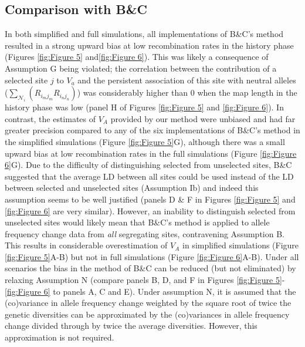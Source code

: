 \documentclass[12pt]{article}
\begin{document}
\begin{bibunit}
\subsection*{Comparison with B\&C}

In both simplified and full simulations, all implementations of B\&C's method resulted in a strong upward bias at low recombination rates in the history phase (Figures \ref{fig:Figure 5} and\ref{fig:Figure 6}). This was likely a consequence of Assumption G being violated; the correlation between the contribution of a selected site $j$ to $V_a$ and the persistent association of this site with neutral alleles ($\sum_{ \mathcal{N}_i}(R_{{i_m}{j_m}}R_{{i_n}{j_n}})$) was considerably higher than 0 when the map length in the history phase was low (panel H of Figures \ref{fig:Figure 5} and \ref{fig:Figure 6}). In contrast, the estimates of $V_A$ provided by our method were unbiased and had far greater precision compared to any of the six implementations of B\&C's method in the simplified simulations (Figure \ref{fig:Figure 5}G), although there was a small upward bias at low recombination rates in the full simulations (Figure \ref{fig:Figure 6}G). Due to the difficulty of distinguishing selected from unselected sites, B\&C suggested that the average LD between all sites could be used instead of the LD between selected and unselected sites (Assumption Ib) and indeed this assumption seems to be well justified (panels D \& F in Figures \ref{fig:Figure 5} and \ref{fig:Figure 6} are very similar). However, an inability to distinguish selected from unselected sites would likely mean that B\&C's method is applied to allele frequency change data from \emph{all} segregating sites, contravening Assumption B. This results in considerable overestimation of $V_A$ in simplified simulations (Figure \ref{fig:Figure 5}A-B) but not in full simulations (Figure \ref{fig:Figure 6}A-B). Under all scenarios the bias in the method of B\&C can be reduced (but not eliminated) by relaxing Assumption N (compare panels B, D, and F in Figures \ref{fig:Figure 5}-\ref{fig:Figure 6} to panels A, C and E). Under assumption N, it is assumed that the (co)variance in allele frequency change weighted by the square root of twice the genetic diversities can be approximated by the (co)variances in allele frequency change divided through by twice the average diversities. However, this approximation is not required. 


\end{bibunit}
\end{document}
